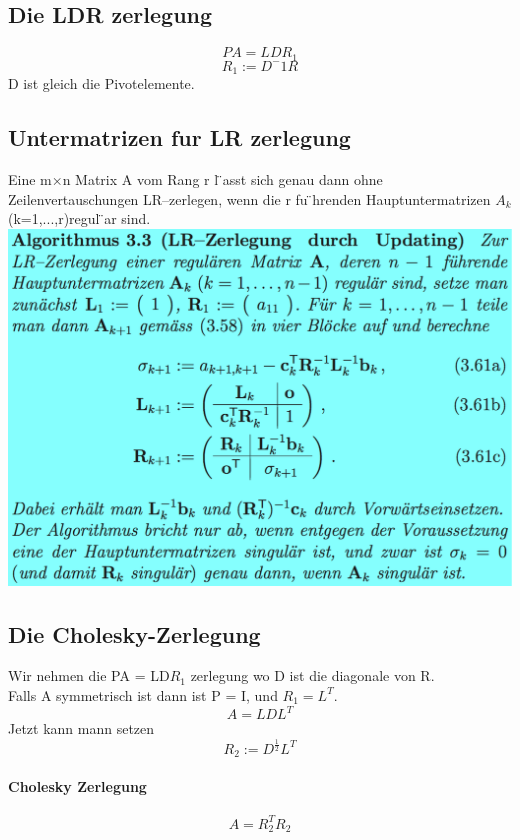 \documentclass[11pt]{article}
\newcommand\back[1][-3cm]{\hspace*{#1}}
\begin{document}
\subsection{Die LDR zerlegung}
\begin{equation}
	PA=LDR_1
\end{equation}
\begin{equation}
	R_1:=D^-1R
\end{equation}
D ist gleich die Pivotelemente.
\subsection{Untermatrizen fur LR zerlegung}
Eine m×n Matrix A vom Rang r l ̈asst sich genau dann ohne Zeilenvertauschungen LR–zerlegen, wenn die r fu ̈hrenden Hauptuntermatrizen $A_k$ (k=1,...,r)regul ̈ar sind.\\
\back\includegraphics{images/updating}\\
\subsection{Die Cholesky-Zerlegung}
Wir nehmen die PA = LD$R_1$ zerlegung wo D ist die diagonale von R.\\Falls A symmetrisch ist dann ist P = I, und $R_1 = L^T$.
\begin{equation}
	A=LDL^T
\end{equation}
Jetzt kann mann setzen
\begin{equation}
	R_2 := D^\frac{1}{2}L^T
\end{equation}
\paragraph{Cholesky Zerlegung}
\begin{equation}
	A = R_2^TR_2
\end{equation}
\end{document}
